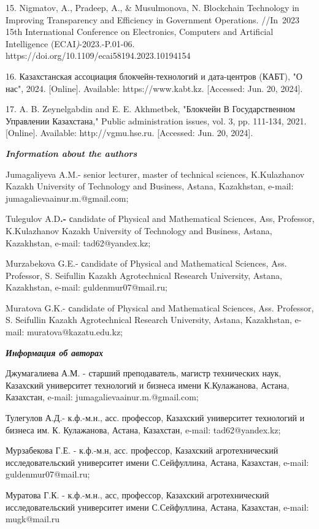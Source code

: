 15. Nigmatov, A., Pradeep, A., \& Musulmonova, N. Blockchain Technology
in Improving Transparency and Efficiency in Government Operations.
//In~2023 15th International Conference on Electronics, Computers and
Artificial Intelligence (ECAI\emph{)}-2023.-P.01-06.
https://doi.org/10.1109/ecai58194.2023.10194154

16. Казахстанская ассоциация блокчейн-технологий и дата-центров (КАБТ),
"О нас", 2024. {[}Online{]}. Available: https://www.kabt.kz.
{[}Accessed: Jun. 20, 2024{]}.

17. A. B. Zeynelgabdin and E. E. Akhmetbek, "Блокчейн В Государственном
Управлении Казахстана," Public administration issues, vol. 3, pp.
111-134, 2021. {[}Online{]}. Available: http://vgmu.hse.ru. {[}Accessed:
Jun. 20, 2024{]}.

\emph{{\bfseries Information about the authors}}

Jumagaliyeva A.M.- senior lecturer, master of technical sciences,
K.Kulazhanov Kazakh University of Technology and Business, Astana,
Kazakhstan, e-mail: jumagalievaainur.m.@gmail.com;

Tulegulov A.D{\bfseries .-} сandidate of Physical and Mathematical
Sciences, Ass, Professor, K.Kulazhanov Kazakh University of Technology
and Business, Astana, Kazakhstan, e-mail: tad62@yandex.kz;

Murzabekova G.E.- сandidate of Physical and Mathematical Sciences, Ass.
Professor, S. Seifullin Kazakh Agrotechnical Research University,
Astana, Kazakhstan, e-mail: guldenmur07@mail.ru;

Muratova G.K.- сandidate of Physical and Mathematical Sciences, Ass.
Professor, S. Seifullin Kazakh Agrotechnical Research University,
Astana, Kazakhstan, e-mail: muratova@kazatu.edu.kz;

\emph{{\bfseries Информация об авторах}}

Джумагалиева А.М. - старший преподаватель, магистр технических наук,
Казахский университет технологий и бизнеса имени К.Кулажанова, Астана,
Казахстан, e-mail: jumagalievaainur.m.@gmail.com;

Тулегулов А.Д.- к.ф.-м.н., асс. профессор, Казахский университет
технологий и бизнеса им. К. Кулажанова, Астана, Казахстан, e-mail:
tad62@yandex.kz;

Мурзабекова Г.Е. - к.ф.-м.н, асс. профессор, Казахский агротехнический
исследовательский университет имени С.Сейфуллина, Астана, Казахстан,
e-mail: guldenmur07@mail.ru;

Муратова Г.К. - к.ф.-м.н., асс, профессор, Казахский агротехнический
исследовательский университет имени С.Сейфуллина, Астана, Казахстан,
e-mail: mugk@mail.ru
